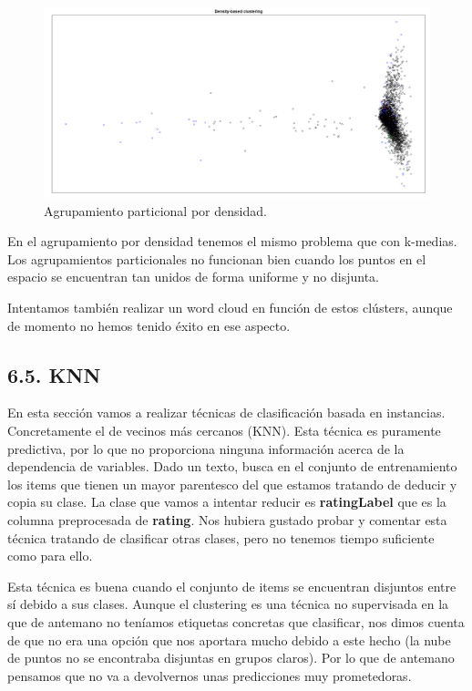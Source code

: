 \documentclass[spanish,]{article}
\begin{document}
\begin{figure}[h]
    \centering
    \includegraphics[width=1\textwidth]{figuras/clustering/dbscan.png}
    \caption{Agrupamiento particional por densidad.}
    \label{fig:clustering:densidad}
\end{figure}

En el agrupamiento por densidad tenemos el mismo problema que con
k-medias. Los agrupamientos particionales no funcionan bien cuando los
puntos en el espacio se encuentran tan unidos de forma uniforme y no
disjunta.

Intentamos también realizar un word cloud en función de estos clústers,
aunque de momento no hemos tenido éxito en ese aspecto.

\subsection{6.5. KNN}\label{knn}

En esta sección vamos a realizar técnicas de clasificación basada en
instancias. Concretamente el de vecinos más cercanos (KNN). Esta técnica
es puramente predictiva, por lo que no proporciona ninguna información
acerca de la dependencia de variables. Dado un texto, busca en el
conjunto de entrenamiento los items que tienen un mayor parentesco del
que estamos tratando de deducir y copia su clase. La clase que vamos a
intentar reducir es \textbf{ratingLabel} que es la columna preprocesada
de \textbf{rating}. Nos hubiera gustado probar y comentar esta técnica
tratando de clasificar otras clases, pero no tenemos tiempo suficiente
como para ello.

Esta técnica es buena cuando el conjunto de items se encuentran
disjuntos entre sí debido a sus clases. Aunque el clustering es una
técnica no supervisada en la que de antemano no teníamos etiquetas
concretas que clasificar, nos dimos cuenta de que no era una opción que
nos aportara mucho debido a este hecho (la nube de puntos no se
encontraba disjuntas en grupos claros). Por lo que de antemano pensamos
que no va a devolvernos unas predicciones muy prometedoras.
\end{document}
